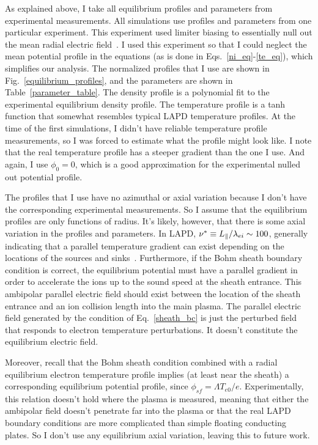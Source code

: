 As explained above, I take all equilibrium profiles and parameters from experimental measurements. 
All simulations use profiles and parameters from one particular experiment.
This experiment used limiter biasing to essentially null out the mean radial electric field~\cite{schaffner2012}. I used this experiment so that I could neglect the mean potential profile
in the equations (as is done in Eqs.~\ref{ni_eq}-\ref{te_eq}), which simplifies our analysis. The normalized profiles that I use are shown in Fig.~\ref{equilibrium_profiles}, and the parameters
are shown in Table~\ref{parameter_table}. The density profile is
a polynomial fit to the experimental equilibrium density profile. The temperature profile is a tanh function that somewhat resembles typical LAPD temperature profiles. At the time of the first
simulations, I didn't have reliable temperature profile measurements, so I was forced to estimate what the profile might look like. I note that the real temperature profile has a steeper
gradient than the one I use. And again, I use $\phi_0 = 0$, which is a good approximation for the experimental nulled out potential profile.

The profiles that I use have no azimuthal or axial variation because I don't have the corresponding experimental measurements. So I assume that the equilibrium profiles are only functions
of radius. It's likely, however, that there is some axial variation in the profiles and parameters. In LAPD, $\nu^* \equiv L_\parallel/\lambda_{ei} \sim 100$, generally indicating that a
parallel temperature gradient can exist depending on the locations of the sources and sinks~\cite{stangeby2000}. 
Furthermore, if the Bohm sheath boundary condition is correct, the equilibrium potential must have a parallel gradient in order
to accelerate the ions up to the sound speed at the sheath entrance. This ambipolar parallel electric field should exist between the location of the sheath entrance and an ion collision length
into the main plasma. The parallel electric field generated by the condition of Eq.~\ref{sheath_bc} is just the perturbed field that responds to electron temperature perturbations. It doesn't
constitute the equilibrium electric field. 

Moreover, recall that the Bohm sheath condition combined with a radial equilibrium electron temperature profile implies (at least near the sheath) a corresponding equilibrium potential profile, since 
$\phi_{sf} = \Lambda T_{e0} / e$. Experimentally, this relation doesn't hold where the plasma is measured, meaning that either the ambipolar field doesn't penetrate far into the plasma or that
the real LAPD boundary conditions are more complicated than simple floating conducting plates. So I don't use any equilibrium axial variation, leaving this to future work.



